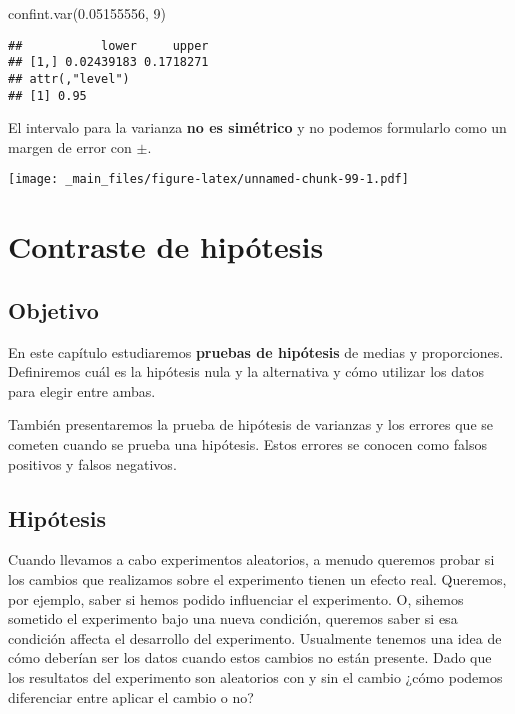 \documentclass[
]{book}
\newenvironment{Shaded}{\begin{snugshade}}{\end{snugshade}}
\newcommand{\DecValTok}[1]{\textcolor[rgb]{0.00,0.00,0.81}{#1}}
\newcommand{\FloatTok}[1]{\textcolor[rgb]{0.00,0.00,0.81}{#1}}
\newcommand{\FunctionTok}[1]{\textcolor[rgb]{0.00,0.00,0.00}{#1}}
\newcommand{\NormalTok}[1]{#1}
\begin{document}
\begin{Shaded}
\begin{Highlighting}[]
\FunctionTok{confint.var}\NormalTok{(}\FloatTok{0.05155556}\NormalTok{, }\DecValTok{9}\NormalTok{)}
\end{Highlighting}
\end{Shaded}

\begin{verbatim}
##           lower     upper
## [1,] 0.02439183 0.1718271
## attr(,"level")
## [1] 0.95
\end{verbatim}

El intervalo para la varianza \textbf{no es simétrico} y no podemos formularlo como un margen de error con \(\pm\).

\texttt{[image: \_main\_files/figure-latex/unnamed-chunk-99-1.pdf]}

\hypertarget{contraste-de-hipuxf3tesis}{%
\chapter{Contraste de hipótesis}\label{contraste-de-hipuxf3tesis}}

\hypertarget{objetivo-10}{%
\section{Objetivo}\label{objetivo-10}}

En este capítulo estudiaremos \textbf{pruebas de hipótesis} de medias y proporciones. Definiremos cuál es la hipótesis nula y la alternativa y cómo utilizar los datos para elegir entre ambas.

También presentaremos la prueba de hipótesis de varianzas y los errores que se cometen cuando se prueba una hipótesis. Estos errores se conocen como falsos positivos y falsos negativos.

\hypertarget{hipuxf3tesis}{%
\section{Hipótesis}\label{hipuxf3tesis}}

Cuando llevamos a cabo experimentos aleatorios, a menudo queremos probar si los cambios que realizamos sobre el experimento tienen un efecto real. Queremos, por ejemplo, saber si hemos podido influenciar el experimento. O, sihemos sometido el experimento bajo una nueva condición, queremos saber si esa condición affecta el desarrollo del experimento. Usualmente tenemos una idea de cómo deberían ser los datos cuando estos cambios no están presente. Dado que los resultatos del experimento son aleatorios con y sin el cambio ¿cómo podemos diferenciar entre aplicar el cambio o no?
\end{document}
